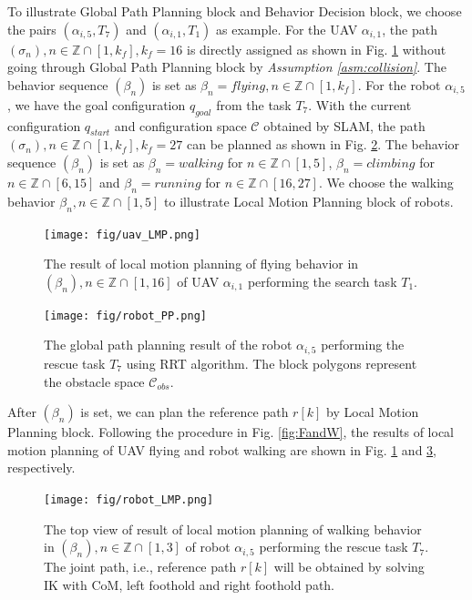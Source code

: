 \documentclass[journal,12pt,onecolumn,draftclsnofoot,]{IEEEtran}
\begin{document}
To illustrate Global Path Planning block and Behavior Decision block, we choose the pairs $(\alpha_{i,5},T_7)$ and $(\alpha_{i,1}, T_1)$ as example. For the UAV $\alpha_{i,1}$, the path $(\sigma_n),n\in\mathbb{Z}\cap[1,k_f],k_f=16$ is directly assigned as shown in Fig. \ref{sim:flying} without going through Global Path Planning block by \textit{Assumption \ref{asm:collision}}. The behavior sequence $(\beta_n)$ is set as $\beta_n=\mathit{flying}, n\in\mathbb{Z}\cap[1,k_f]$. For the robot $\alpha_{i,5}$, we have the goal configuration $q_{goal}$ from the task $T_7$. With the current configuration $q_{start}$ and configuration space $\mathcal{C}$ obtained by SLAM, the path $(\sigma_n),n\in\mathbb{Z}\cap[1,k_f],k_f=27$ can be planned as shown in Fig. \ref{fig:R_task}. The behavior sequence $(\beta_n)$ is set as $\beta_n=\mathit{walking}$ for $n\in\mathbb{Z}\cap[1,5]$, $\beta_n=\mathit{climbing}$ for $n\in\mathbb{Z}\cap[6,15]$ and $\beta_n=\mathit{running}$ for $n\in\mathbb{Z}\cap[16,27]$. We choose the walking behavior $\beta_n, n\in\mathbb{Z}\cap[1,5]$ to illustrate Local Motion Planning block of robots.
\begin{figure}[htbp]
    \centering
    \texttt{[image: fig/uav\_LMP.png]}\caption{The result of local motion planning of flying behavior in $(\beta_n), n\in\mathbb{Z}\cap[1,16]$ of UAV $\alpha_{i,1}$ performing the search task $T_1$.}%
    \label{sim:flying}
\end{figure}
\begin{figure}[htbp]
    \centering
    \texttt{[image: fig/robot\_PP.png]}\caption{The global path planning result of the robot $\alpha_{i,5}$ performing the rescue task $T_7$ using RRT algorithm. The block polygons represent the obstacle space $\mathcal{C}_{obs}$.}%
    \label{fig:R_task}
\end{figure}

After $(\beta_n)$ is set, we can plan the reference path $r[k]$ by Local Motion Planning block. Following the procedure in Fig. \ref{fig:FandW}, the results of local motion planning of UAV flying and robot walking are shown in Fig. \ref{sim:flying} and \ref{sim:walking}, respectively.
\begin{figure}[htbp]
    \centering
    \texttt{[image: fig/robot\_LMP.png]}\caption{The top view of result of local motion planning of walking behavior in $(\beta_n), n\in\mathbb{Z}\cap[1,3]$ of robot $\alpha_{i,5}$ performing the rescue task $T_7$. The joint path, i.e., reference path $r[k]$ will be obtained by solving IK with CoM, left foothold and right foothold path.}
    \label{sim:walking}
\end{figure}
\end{document}

